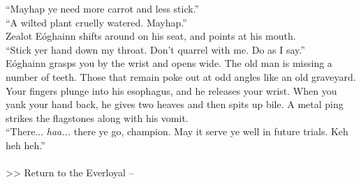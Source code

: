 “Mayhap ye need more carrot and less stick.”\\

“A wilted plant cruelly watered. Mayhap.”\\

Zealot Eóghainn shifts around on his seat, and points at his mouth.\\

“Stick yer hand down my throat. Don’t quarrel with me. Do as I say.”\\

Eóghainn grasps you by the wrist and opens wide. The old man is missing a number of teeth. Those that remain poke out at odd angles like an old graveyard.\\

Your fingers plunge into his esophagus, and he releases your wrist. When you yank your hand back, he gives two heaves and then spits up bile. A metal ping strikes the flagstones along with his vomit.\\

“There... \emph{haa...} there ye go, champion. May it serve ye well in future trials. Keh heh heh.”\\
\\

>>  Return to the Everloyal -- 